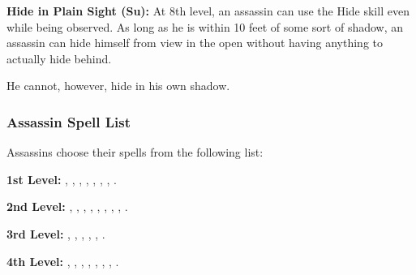 \textbf{Hide in Plain Sight (Su):} At 8th level, an assassin can use the Hide skill 
even while being observed. As long as he is within 10 feet of some sort of shadow, 
an assassin can hide himself from view in the open without having anything to actually 
hide behind.

He cannot, however, hide in his own shadow.

\subsubsection{Assassin Spell List}

Assassins choose their spells from the following list:

\textbf{1st Level:} , , , , , , , .

\textbf{2nd Level:} , , , , , , , , .

\textbf{3rd Level:} , , , , , .

\textbf{4th Level:} , , , , , , , .
